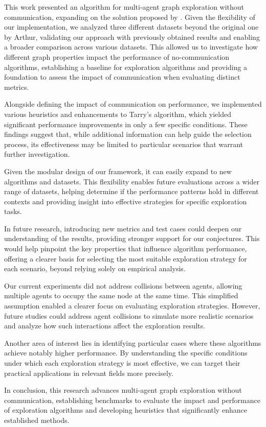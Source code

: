 This work presented an algorithm for multi-agent graph exploration without communication, expanding on the solution proposed by . Given the flexibility of our implementation, we analyzed three different datasets beyond the original one by Arthur, validating our approach with previously obtained results and enabling a broader comparison across various datasets. This allowed us to investigate how different graph properties impact the performance of no-communication algorithms, establishing a baseline for exploration algorithms and providing a foundation to assess the impact of communication when evaluating distinct metrics.

Alongside defining the impact of communication on performance, we implemented various heuristics and enhancements to Tarry's algorithm, which yielded significant performance improvements in only a few specific conditions. These findings suggest that, while additional information can help guide the selection process, its effectiveness may be limited to particular scenarios that warrant further investigation.

Given the modular design of our framework, it can easily expand to new algorithms and datasets. This flexibility enables future evaluations across a wider range of datasets, helping determine if the performance patterns hold in different contexts and providing insight into effective strategies for specific exploration tasks.

In future research, introducing new metrics and test cases could deepen our understanding of the results, providing stronger support for our conjectures. This would help pinpoint the key properties that influence algorithm performance, offering a clearer basis for selecting the most suitable exploration strategy for each scenario, beyond relying solely on empirical analysis.

Our current experiments did not address collisions between agents, allowing multiple agents to occupy the same node at the same time. This simplified assumption enabled a clearer focus on evaluating exploration strategies. However, future studies could address agent collisions to simulate more realistic scenarios and analyze how such interactions affect the exploration results.

Another area of interest lies in identifying particular cases where these algorithms achieve notably higher performance. By understanding the specific conditions under which each exploration strategy is most effective, we can target their practical applications in relevant fields more precisely.

In conclusion, this research advances multi-agent graph exploration without communication, establishing benchmarks to evaluate the impact and performance of exploration algorithms and developing heuristics that significantly enhance established methods.